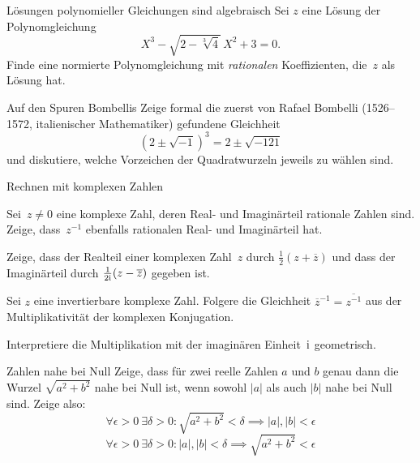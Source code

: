 \documentclass{algblatt}
\begin{document}
\vspace*{-1.2cm}

\begin{aufgabe}{Lösungen polynomieller Gleichungen sind algebraisch}
Sei $z$ eine Lösung der Polynomgleichung
\[ X^3 - \sqrt{2 - \sqrt[3] 4} \, X^2 + 3 = 0. \]
Finde eine normierte Polynomgleichung mit \emph{rationalen} Koeffizienten,
die~$z$ als Lösung hat.
\end{aufgabe}

\begin{aufgabe}{Auf den Spuren Bombellis}
Zeige formal die zuerst von Rafael Bombelli (1526--1572, italienischer
Mathematiker) gefundene
Gleichheit
\[
    (2 \pm \sqrt{-1})^3 = 2 \pm \sqrt{- 121}
\]
und diskutiere, welche Vorzeichen der Quadratwurzeln jeweils zu wählen sind.
\end{aufgabe}

\begin{aufgabeE}{Rechnen mit komplexen Zahlen}
\item
Sei~$z \neq 0$ eine komplexe Zahl, deren Real- und Imaginärteil rationale
Zahlen sind. Zeige, dass~$z^{-1}$ ebenfalls rationalen Real- und Imaginärteil
hat.
\item
Zeige, dass der Realteil einer komplexen Zahl~$z$ durch
\(\frac 1 2 (z + \overline z)\)
und dass der Imaginärteil durch \(\frac 1 {2 \mathrm{i}} (z - \overline z)\)
gegeben ist.
\item
Sei \(z\) eine invertierbare komplexe Zahl. Folgere die Gleichheit
$
    \overline{z}^{-1} = \overline{z^{-1}}
$
aus der Multiplikativität der komplexen Konjugation.
\item
Interpretiere die Multiplikation mit der imaginären Einheit~$\mathrm{i}$
geometrisch.
\end{aufgabeE}

\begin{aufgabe}{Zahlen nahe bei Null}
Zeige, dass für zwei reelle Zahlen $a$ und $b$ genau dann die Wurzel
$\sqrt{a^2 + b^2}$ nahe bei Null ist, wenn sowohl $|a|$ als auch $|b|$
nahe bei Null sind. Zeige also:
\[    \forall \epsilon > 0\ \exists \delta > 0  \colon 
        \sqrt{a^2 + b^2} < \delta  \implies |a|, |b| < \epsilon
\]
\[
    \forall \epsilon > 0\ \exists \delta > 0  \colon 
        |a|, |b| < \delta  \implies \sqrt{a^2  + b^2} < \epsilon
\]
\vspace{-1.5em}
\end{aufgabe}
\end{document}
